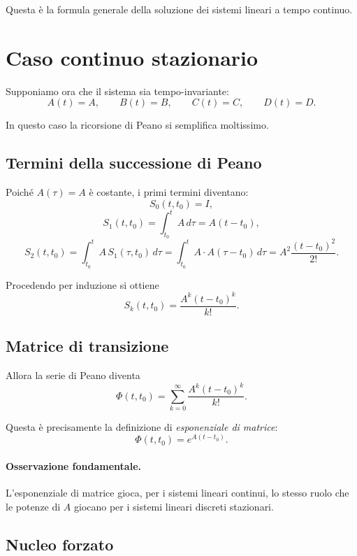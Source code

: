 Questa è la formula generale della soluzione dei sistemi lineari a tempo continuo.

\section{Caso continuo stazionario}

Supponiamo ora che il sistema sia tempo-invariante:
\[
A(t)=A,\qquad B(t)=B,\qquad C(t)=C,\qquad D(t)=D.
\]

In questo caso la ricorsione di Peano si semplifica moltissimo.

\subsection{Termini della successione di Peano}

Poiché $A(\tau)=A$ è costante, i primi termini diventano:
\[
S_0(t,t_0)=I,
\]
\[
S_1(t,t_0)=\int_{t_0}^{t}A\,d\tau=A(t-t_0),
\]
\[
S_2(t,t_0)=\int_{t_0}^{t}A\,S_1(\tau,t_0)\,d\tau
=
\int_{t_0}^{t}A\cdot A(\tau-t_0)\,d\tau
=
A^2\frac{(t-t_0)^2}{2!}.
\]

Procedendo per induzione si ottiene
\begin{equation}
S_k(t,t_0)=\frac{A^k(t-t_0)^k}{k!}.
\label{eq:L4_Peano_TI_term}
\end{equation}

\subsection{Matrice di transizione}

Allora la serie di Peano diventa
\[
\Phi(t,t_0)=\sum_{k=0}^{\infty}\frac{A^k(t-t_0)^k}{k!}.
\]

Questa è precisamente la definizione di \emph{esponenziale di matrice}:
\begin{equation}
\boxed{
\Phi(t,t_0)=e^{A(t-t_0)}.
}
\label{eq:L4_Phi_exp_matrix}
\end{equation}

\paragraph{Osservazione fondamentale.}
L'esponenziale di matrice gioca, per i sistemi lineari continui, lo stesso ruolo che le potenze di $A$ giocano per i sistemi lineari discreti stazionari.

\subsection{Nucleo forzato}

